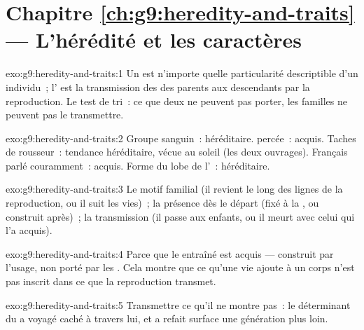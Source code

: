 \section*{Chapitre \ref{ch:g9:heredity-and-traits} --- L'hérédité et les caractères}

\begin{solution}{exo:g9:heredity-and-traits:1}
Un  est n'importe quelle particularité
descriptible d'un individu~; l' est la transmission
des  des parents aux descendants par la
reproduction. Le test de tri~: ce que deux  ne
peuvent pas porter, les familles ne peuvent pas le
transmettre.
\end{solution}

\begin{solution}{exo:g9:heredity-and-traits:2}
Groupe sanguin~: héréditaire.  percée~: acquis.
Taches de rousseur~: tendance héréditaire, vécue au soleil
(les deux ouvrages). Français parlé couramment~: acquis.
Forme du lobe de l'~: héréditaire.
\end{solution}

\begin{solution}{exo:g9:heredity-and-traits:3}
Le motif familial (il revient le long des lignes de la
reproduction, ou il suit les vies)~; la présence dès le
départ (fixé à la , ou construit après)~; la
transmission (il passe aux enfants, ou il meurt avec celui
qui l'a acquis).
\end{solution}

\begin{solution}{exo:g9:heredity-and-traits:4}
Parce que le  entraîné est acquis --- construit par
l'usage, non porté par les . Cela montre que ce
qu'une vie ajoute à un corps n'est pas inscrit dans ce que
la reproduction transmet.
\end{solution}

\begin{solution}{exo:g9:heredity-and-traits:5}
Transmettre ce qu'il ne montre pas~: le déterminant du
 a voyagé caché à travers lui, et a refait surface
une génération plus loin.
\end{solution}


